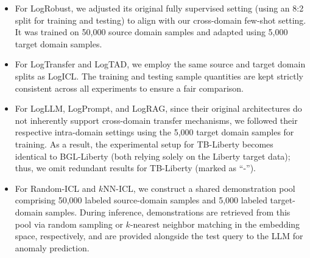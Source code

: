 \documentclass[lettersize,journal]{IEEEtran}
\begin{document}
\begin{itemize}
    \item For LogRobust, we adjusted its original fully supervised setting (using an 8:2 split for training and testing) to align with our cross-domain few-shot setting. It was trained on 50,000 source domain samples and adapted using 5,000 target domain samples.
    \item For LogTransfer and LogTAD, we employ the same source and target domain splits as LogICL. The training and testing sample quantities are kept strictly consistent across all experiments to ensure a fair comparison.
    
    \item For LogLLM, LogPrompt, and LogRAG, since their original architectures do not inherently support cross-domain transfer mechanisms, we followed their respective intra-domain settings using the 5,000 target domain samples for training. As a result, the experimental setup for TB-Liberty becomes identical to BGL-Liberty (both relying solely on the Liberty target data); thus, we omit redundant results for TB-Liberty (marked as ``-'').
    \item For Random-ICL and $k$NN-ICL, we construct a shared demonstration pool comprising 50,000 labeled source-domain samples and 5,000 labeled target-domain samples. During inference, demonstrations are retrieved from this pool via random sampling or $k$-nearest neighbor matching in the embedding space, respectively, and are provided alongside the test query to the LLM for anomaly prediction.
\end{itemize}
\end{document}
